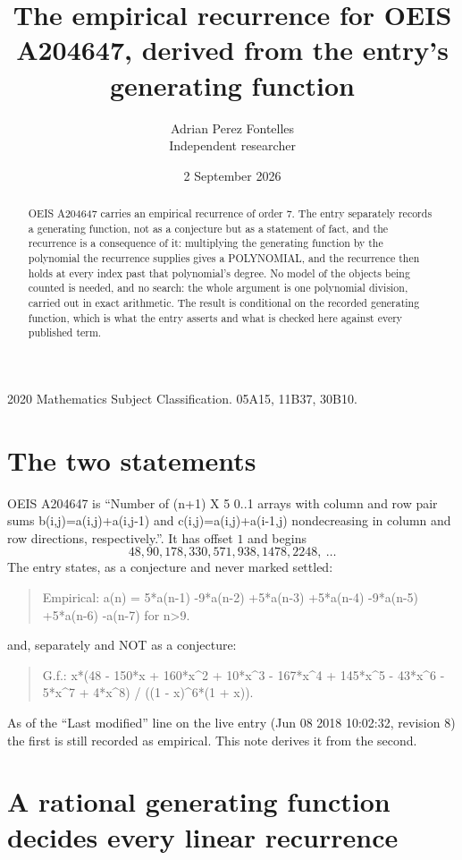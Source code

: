 \documentclass[11pt,a4paper]{article}
\title{The empirical recurrence for OEIS A204647, derived from the entry's generating function}
\author{Adrian Perez Fontelles\\ \small Independent researcher}
\date{2 September 2026}
\theoremstyle{plain}
\theoremstyle{definition}
\begin{document}
\maketitle

\begin{abstract}
OEIS A204647 carries an empirical recurrence of order $7$. The entry separately records a
generating function, not as a conjecture but as a statement of fact, and the recurrence is a
consequence of it: multiplying the generating function by the polynomial the recurrence
supplies gives a POLYNOMIAL, and the recurrence then holds at every index past that
polynomial's degree. No model of the objects being counted is needed, and no search: the
whole argument is one polynomial division, carried out in exact arithmetic. The result is
conditional on the recorded generating function, which is what the entry asserts and what is
checked here against every published term.
\end{abstract}

\noindent\small 2020 Mathematics Subject Classification. 05A15, 11B37, 30B10.\normalsize

\section{The two statements}

OEIS A204647 is ``Number of (n+1) X 5 0..1 arrays with column and row pair sums b(i,j)=a(i,j)+a(i,j-1) and c(i,j)=a(i,j)+a(i-1,j) nondecreasing in column and row directions, respectively.''. It has offset $1$ and begins
\[
48, 90, 178, 330, 571, 938, 1478, 2248,\ \dots
\]
The entry states, as a conjecture and never marked settled:
\begin{quote}
Empirical: a(n) = 5*a(n-1) -9*a(n-2) +5*a(n-3) +5*a(n-4) -9*a(n-5) +5*a(n-6) -a(n-7) for n>9.
\end{quote}
and, separately and NOT as a conjecture:
\begin{quote}
G.f.: x*(48 - 150*x + 160*x\^{}2 + 10*x\^{}3 - 167*x\^{}4 + 145*x\^{}5 - 43*x\^{}6 - 5*x\^{}7 + 4*x\^{}8) / ((1 - x)\^{}6*(1 + x)).
\end{quote}
As of the ``Last modified'' line on the live entry (Jun 08 2018 10:02:32, revision 8) the first is still
recorded as empirical. This note derives it from the second.

\section{A rational generating function decides every linear recurrence}
\end{document}
